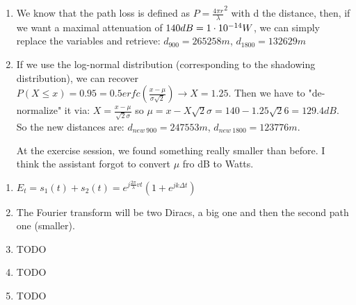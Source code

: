 \begin{solution}
	\begin{enumerate}
		\item We know that the path loss is defined as $P = \frac{4\pi r}{\lambda}^2$ with d the distance, then, if we want a maximal attenuation of $140dB = 1\cdot 10^{-14} W$, we can simply replace the variables and retrieve:
		$d_{900} = 265258m$, $d_{1800} = 132629m$
		
		\item If we use the log-normal distribution (corresponding to the shadowing distribution), we can recover $P(X \leq x) = 0.95 = 0.5 erfc(\frac{x - \mu}{\sigma \sqrt{2}}) \rightarrow X = 1.25$. Then we have to "de-normalize" it via: $X = \frac{x - \mu}{\sqrt{2} \sigma}$ so $\mu = x - X\sqrt{2}\sigma = 140 - 1.25\sqrt{2}6 = 129.4dB$.
		So the new distances are: $d_{new~900} = 247553m$, $d_{new~1800} = 123776m$.
		
		At the exercise session, we found something really smaller than before. I think the assistant forgot to convert $\mu$ fro dB to Watts. \notsure
	\end{enumerate}
\end{solution}

\begin{solution}
	\begin{enumerate}
		\item $E_t = s_1(t) + s_2(t) = e^{j\frac{2 \pi}{\lambda} v t}(1 + e^{jk \Delta t})$
		\item The Fourier transform will be two Diracs, a big one and then the second path one (smaller).
		\item TODO \notsure
 		\item TODO
		\item TODO
	\end{enumerate}
\end{solution}
